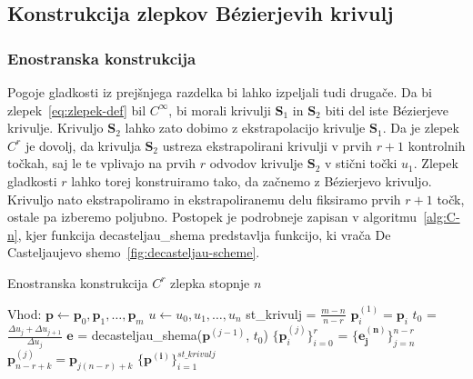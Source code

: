 \documentclass[isrm2, tisk]{fmfdelo}
\newcommand{\p}{\mathbf{p}}
\begin{document}
    \subsection{Konstrukcija zlepkov Bézierjevih krivulj}\label{subsec:konstrukcija-zlepkov}

    \subsubsection{Enostranska konstrukcija}
    Pogoje gladkosti iz prejšnjega razdelka bi lahko izpeljali tudi drugače.
    Da bi zlepek~\eqref{eq:zlepek-def} bil $C^{\infty}$, bi morali krivulji $\mathbf{S}_1$ in $\mathbf{S}_2$ biti del iste Bézierjeve krivulje.
    Krivuljo $\mathbf{S}_2$ lahko zato dobimo z ekstrapolacijo krivulje $\mathbf{S}_1$.
    Da je zlepek $C^r$ je dovolj, da krivulja $\mathbf{S}_2$ ustreza ekstrapolirani krivulji v prvih $r+1$ kontrolnih točkah, saj le te vplivajo na prvih $r$ odvodov krivulje $\mathbf{S}_2$ v stični točki $u_1$.
    Zlepek gladkosti $r$ lahko torej konstruiramo tako, da začnemo z Bézierjevo krivuljo.
    Krivuljo nato ekstrapoliramo in ekstrapoliranemu delu fiksiramo prvih $r+1$ točk, ostale pa izberemo poljubno.
    Postopek je podrobneje zapisan v algoritmu~\ref{alg:C-n}, kjer funkcija decasteljau\_shema predstavlja funkcijo, ki vrača De Casteljaujevo shemo~\ref{fig:decasteljau-scheme}.
    \begin{algorithm}[H]
        \caption{Enostranska konstrukcija $C^r$ zlepka stopnje $n$}
        \label{alg:C-n}
        \begin{algorithmic}
            \State Vhod:
            \State $\p \gets \p_0,\p_1,\dots,\p_{m}$
            \State $u \gets u_0,u_1,\dots,u_n$
            \State
            \State st\_krivulj = $\frac{m-n}{n-r}$
                \State $\p_i^{(1)}=\p_i$
            \EndFor
                \State $t_0$ = $\frac{\Delta u_j + \Delta u_{j+1}}{\Delta u_j}$
                \State $\mathbf{e}$ = decasteljau\_shema($\p^{(j-1)}$, $t_0$)
                \State $\{\p_i^{(j)}\}_{i=0}^{r}$ = $\{\mathbf{e^{(n)}_{j}}\}_{j=n}^{n-r}$
                    \State $\p_{n-r+k}^{(j)}=\p_{j(n-r)+k}$
                \EndFor
            \EndFor
            \State
            \State \Return $\{\mathbf{p^{(i)}}\}^{st\_krivulj}_{i=1}$
        \end{algorithmic}
    \end{algorithm}
\end{document}

